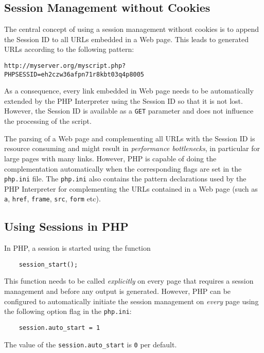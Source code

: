 \documentclass[a4paper, justified, notoc]{tufte-handout} %
\begin{document}
\subsection{Session Management without Cookies} %
\label{sub:session_without_cookies}
The central concept of using a session management without cookies is to append the Session ID to all URLs embedded in a Web page. This leads to generated URLs according to the following pattern:
\begin{Verbatim}
http://myserver.org/myscript.php?PHPSESSID=eh2czw36afpn71r8kbt03q4p8005
\end{Verbatim}  
As a consequence, every link embedded in Web page needs to be automatically extended by the PHP Interpreter using the Session ID so that it is not lost. %
However, the Session ID is available as a \texttt{GET} parameter and does not influence the processing of the script.

The parsing of a Web page and complementing all URLs with the Session ID is resource consuming and might result in \emph{performance bottlenecks}, in particular for large pages with many links.
However, PHP is capable of doing the complementation automatically when the corresponding flags are set in the \texttt{php.ini} file. The \texttt{php.ini} also contains the pattern declarations used by the PHP Interpreter for complementing the URLs contained in a Web page (such as \texttt{a}, \texttt{href}, \texttt{frame}, \texttt{src}, \texttt{form} etc).


\subsection{Using Sessions in PHP} %
\label{sub:using_sessions_in_php}
In PHP, a session is started using the function
\begin{Verbatim}
  	session_start();
\end{Verbatim}  
This function needs to be called \emph{explicitly} on every page that requires a session management and before any output is generated.
However, PHP can be configured to automatically initiate the session management on \emph{every} page using the following option flag in the \texttt{php.ini}:
\begin{Verbatim}
	session.auto_start = 1
\end{Verbatim} 
The value of the \texttt{session.auto\_start} is \texttt{0} per default. 
\end{document}
